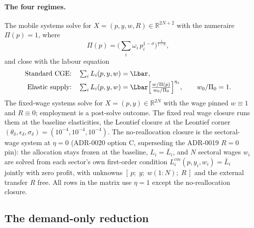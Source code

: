 \paragraph{The four regimes.} The mobile systems solve for
$X = (p, y, w, R) \in \mathbb{R}^{2N+2}$ with the numeraire
$\Pi(p) = 1$, where
\begin{equation}
\Pi(p) = \Big( \textstyle\sum_i \omega_i\, p_i^{1-\sigma}
   \Big)^{\frac{1}{1-\sigma}},
\label{eq:cpi}
\end{equation}
and close with the labour equation
\begin{align}
\text{Standard CGE:}\quad & \textstyle\sum_i L_i(p,y,w) = \Lbar,
\label{eq:alpha}\\
\text{Elastic supply:}\quad & \textstyle\sum_i L_i(p,y,w)
   = \Lbar \Big[ \frac{w/\Pi(p)}{w_0/\Pi_0} \Big]^{\eta_s},
\qquad w_0/\Pi_0 = 1.
\label{eq:beta}
\end{align}
The fixed-wage systems solve for $X = (p, y) \in \mathbb{R}^{2N}$ with the
wage pinned $w \equiv 1$ and $R \equiv 0$; employment is a post-solve
outcome. The fixed real wage closure runs them at the baseline elasticities,
the Leontief closure at the Leontief
corner $(\theta_\delta,\epsilon_\delta,\sigma_\delta) = (10^{-4},10^{-4},
10^{-4})$. The no-reallocation closure is the sectoral-wage system at
$\eta = 0$ (ADR-0020 option C, superseding the ADR-0019 $R = 0$ pin): the
allocation stays frozen at the baseline, $L_i = \bar{L}_i$, and $N$ sectoral
wages $w_i$ are solved from each sector's own first-order condition
$L^{cm}_i(p, y_i, w_i) = \bar{L}_i$ jointly with zero profit, with unknowns
$[\,p;\; y;\; w(1{:}N);\; R\,]$ and the external transfer $R$ free. All rows
in the matrix use $\eta = 1$ except the no-reallocation closure.

\subsection{The demand-only reduction}\label{sec:reduction}

